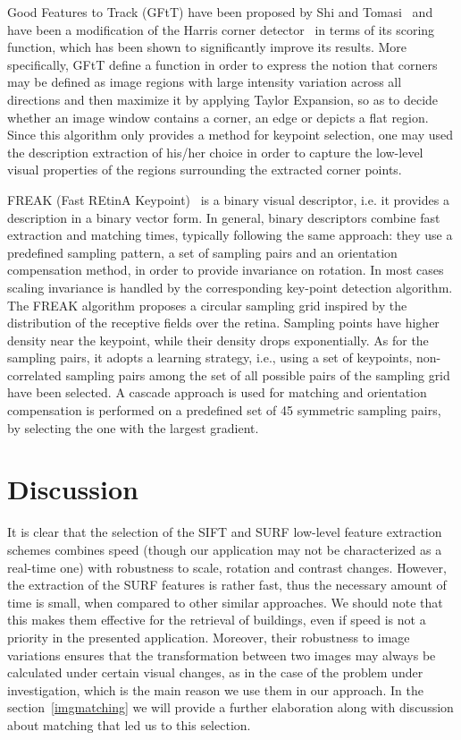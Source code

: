 Good Features to Track (GFtT) have been proposed by Shi
and Tomasi~\cite{shi1994good} and have been a modification of the Harris
corner detector~\cite{harris1988combined} in terms of its scoring function, which has
been shown to significantly improve its results. More
specifically, GFtT define a function in order to express the
notion that corners may be defined as image regions with large
intensity variation across all directions and then maximize it
by applying Taylor Expansion, so as to decide whether an
image window contains a corner, an edge or depicts a flat
region. Since this algorithm only provides a method for keypoint selection, one may used the description extraction of his/her choice in order to capture
the low-level visual properties of the regions surrounding the
extracted corner points.

FREAK (Fast REtinA Keypoint)~\cite{alahi2012freak} is a binary visual
descriptor, i.e. it provides a description in a binary vector
form. In general, binary descriptors combine fast extraction
and matching times, typically following the same approach:
they use a predefined sampling pattern, a set of sampling pairs
and an orientation compensation method, in order to provide
invariance on rotation. In most cases scaling invariance is
handled by the corresponding key-point detection algorithm.
The FREAK algorithm proposes a circular sampling grid
inspired by the distribution of the receptive fields over the
retina. Sampling points have higher density near the keypoint,
while their density drops exponentially. As for the sampling
pairs, it adopts a learning strategy, i.e., using a set of keypoints,
non-correlated sampling pairs among the set of all
possible pairs of the sampling grid have been selected. A
cascade approach is used for matching and orientation
compensation is performed on a predefined set of 45
symmetric sampling pairs, by selecting the one with the
largest gradient.

\section{Discussion}

It is clear that the selection of the SIFT and SURF low-level feature extraction schemes combines speed (though our application may not be characterized as a real-time one) with robustness to scale, rotation and contrast changes. However, the extraction of the SURF features is rather fast, thus the necessary amount of time is small, when compared to other similar approaches. We should note that this makes them effective for the retrieval of buildings, even if speed is not a priority in the presented application. Moreover, their robustness to image variations ensures that the transformation between two images may always be calculated under certain visual changes, as in the case of the problem under investigation, which is the main reason we use them in our approach. 
 In the section~\ref{imgmatching} we will provide a further elaboration along with discussion about matching that led us to this selection.